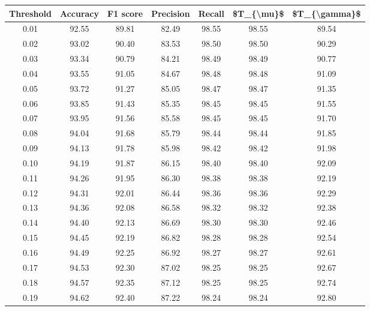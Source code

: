 \begin{tabular}{|c|c|c|c|c|c|c|}
\hline
 Threshold &  Accuracy &  F1 score &  Precision &  Recall &  \$T\_\{\textbackslash mu\}\$ &  \$T\_\{\textbackslash gamma\}\$ \\
\hline
      0.01 &     92.55 &     89.81 &      82.49 &   98.55 &      98.55 &         89.54 \\
      0.02 &     93.02 &     90.40 &      83.53 &   98.50 &      98.50 &         90.29 \\
      0.03 &     93.34 &     90.79 &      84.21 &   98.49 &      98.49 &         90.77 \\
      0.04 &     93.55 &     91.05 &      84.67 &   98.48 &      98.48 &         91.09 \\
      0.05 &     93.72 &     91.27 &      85.05 &   98.47 &      98.47 &         91.35 \\
      0.06 &     93.85 &     91.43 &      85.35 &   98.45 &      98.45 &         91.55 \\
      0.07 &     93.95 &     91.56 &      85.58 &   98.45 &      98.45 &         91.70 \\
      0.08 &     94.04 &     91.68 &      85.79 &   98.44 &      98.44 &         91.85 \\
      0.09 &     94.13 &     91.78 &      85.98 &   98.42 &      98.42 &         91.98 \\
      0.10 &     94.19 &     91.87 &      86.15 &   98.40 &      98.40 &         92.09 \\
      0.11 &     94.26 &     91.95 &      86.30 &   98.38 &      98.38 &         92.19 \\
      0.12 &     94.31 &     92.01 &      86.44 &   98.36 &      98.36 &         92.29 \\
      0.13 &     94.36 &     92.08 &      86.58 &   98.32 &      98.32 &         92.38 \\
      0.14 &     94.40 &     92.13 &      86.69 &   98.30 &      98.30 &         92.46 \\
      0.15 &     94.45 &     92.19 &      86.82 &   98.28 &      98.28 &         92.54 \\
      0.16 &     94.49 &     92.25 &      86.92 &   98.27 &      98.27 &         92.61 \\
      0.17 &     94.53 &     92.30 &      87.02 &   98.25 &      98.25 &         92.67 \\
      0.18 &     94.57 &     92.35 &      87.12 &   98.25 &      98.25 &         92.74 \\
      0.19 &     94.62 &     92.40 &      87.22 &   98.24 &      98.24 &         92.80 \\

\end{tabular}
